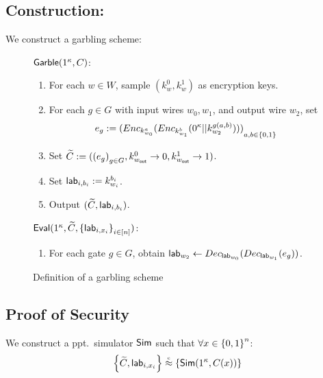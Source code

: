 \subsection{Construction:}
  We construct a garbling scheme:
  \begin{figure}[H]
    \setlength{\parskip}{\baselineskip}%
    \begin{minipage}[t]{\textwidth}
    $\mathsf{Garble}(1^\kappa, C)$:
    \begin{enumerate}
      \item
        For each $w \in W$, sample $(k_w^0, k_w^1)$ as encryption keys.
      \item
        For each $g \in G$ with input wires $w_0, w_1$, and output wire $w_2$, set
      \begin{equation*}e_g := {(Enc_{k_{w_0}^a}(Enc_{k_{w_1}^b}(0^\kappa || k_{w_2}^{g(a,b)})))}_{a,b \in \left\{0,1\right\}}\end{equation*}\vspace{-0.3cm}
      \item
        Set $\widetilde{C} := ({(e_g)}_{g \in G}, k_{w_{\mathsf{out}}}^0 \rightarrow 0, k_{w_{\mathsf{out}}}^1 \rightarrow 1)$.
      \item
        Set $\mathsf{lab}_{i, b_i} := k_{w_i}^{b_i}$.
      \item
        Output $(\widetilde{C}, \mathsf{lab}_{i, b_i})$.
    \end{enumerate}
    \end{minipage}

    \begin{minipage}[t]{\textwidth}
    $\mathsf{Eval}(1^\kappa, \widetilde{C}, \left\{\mathsf{lab}_{i, x_i}\right\}_{i \in [n]})$:
    \begin{enumerate}
      \item
        For each gate $g \in G$, obtain $\mathsf{lab}_{w_2} \gets Dec_{\mathsf{lab}_{w_0}}(Dec_{\mathsf{lab}_{w_1}}(e_g))$.
    \end{enumerate}
    \end{minipage}
    \caption{Definition of a garbling scheme}
    \label{alg:garbling-scheme}
  \end{figure}

\subsection{Proof of Security}
\proof
  We construct a ppt.\ simulator $\mathsf{Sim}$ such that $\forall x \in \left\{0,1\right\}^n$:
  \begin{equation*}
    \set{\GCir, \Lab_{i, x_i}} \indis \set{\Sim(1^\Param, \Cir(x))}
  \end{equation*}

